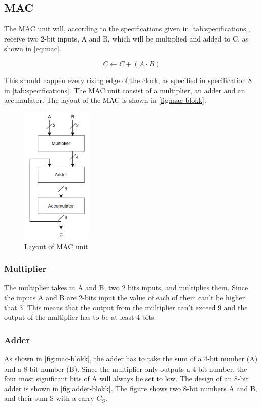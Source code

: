 \subsection{MAC}
\label{subsec:MAC_theory}

The MAC unit will, according to the specifications given in \autoref{tab:specifications}, receive two 2-bit inputs, A and B, which will be multiplied and added to C, as shown in \autoref{eq:mac}. 

\begin{equation}
    \label{eq:mac}
    C \leftarrow C + (A \cdot B)
\end{equation}

 This should happen every rising edge of the clock, as specified in specification 8 in \autoref{tab:specifications}. The MAC unit consist of a multiplier, an adder and an accumulator. The layout of the MAC is shown in \autoref{fig:mac-blokk}. 

\begin{figure}[htpb]
    \centering
    \includegraphics[width=0.3\textwidth]{Figures/mac-blokk.png}
    \caption{Layout of MAC unit}
    \label{fig:mac-blokk}
\end{figure}


\subsubsection{Multiplier}
The multiplier takes in A and B, two 2 bits inputs, and multiplies them. Since the inputs A and B are 2-bits input the value of each of them can't be higher that 3. This means that the output from the multiplier can't exceed 9 and the output of the multiplier has to be at least 4 bits. 

\subsubsection{Adder}
As shown in \autoref{fig:mac-blokk}, the adder has to take the sum of a 4-bit number (A) and a 8-bit number (B). Since the multiplier only outputs a 4-bit number, the four most significant bits of A will always be set to low. The design of an 8-bit adder is shown in \autoref{fig:adder-blokk}. The figure shows two 8-bit numbers A and B, and their sum S with a carry $C_O$. 

